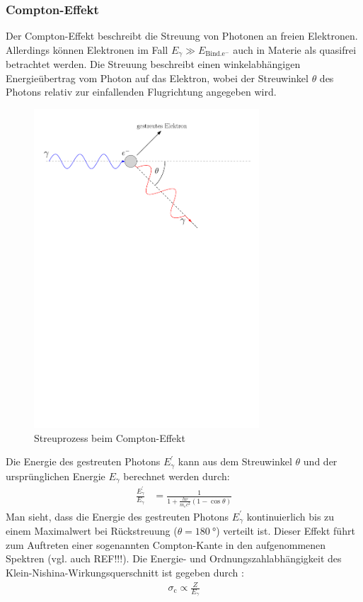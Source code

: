 \documentclass[11pt, a4paper]{article}
\numberwithin{equation}{section}
\begin{document}
\subsubsection{Compton-Effekt}
Der Compton-Effekt beschreibt die Streuung von Photonen an freien Elektronen.
Allerdings können Elektronen im Fall $E_\gamma \gg E_\mathrm{Bind. e^{-}}$ auch in Materie als quasifrei betrachtet werden.
Die Streuung beschreibt einen winkelabhängigen Energieübertrag vom Photon auf das Elektron, wobei der Streuwinkel $\theta$ des Photons relativ zur einfallenden Flugrichtung angegeben wird.
\begin{figure}
	\centering
	\includegraphics[width=0.75\textwidth]{./figures/compton.pdf}
	\caption{Streuprozess beim Compton-Effekt}
	\label{fig:comptoneffekt}
\end{figure}
Die Energie des gestreuten Photons $E_\gamma^\prime$ kann aus dem Streuwinkel $\theta$ und der ursprünglichen Energie $E_\gamma$ berechnet werden durch:
\begin{align}
	\frac{E_\gamma^\prime}{E_\gamma} &= \frac{1}{1 + \frac{h \nu}{m_\mathrm{e} c^2} (1-\cos\theta)}
\end{align}
Man sieht, dass die Energie des gestreuten Photons $E_\gamma^\prime$ kontinuierlich bis zu einem Maximalwert bei Rückstreuung ($\theta = \SI{180}{\degree}$) verteilt ist.
Dieser Effekt führt zum Auftreten einer sogenannten Compton-Kante in den aufgenommenen Spektren (vgl. auch REF!!!).
Die Energie- und Ordnungszahlabhängigkeit des Klein-Nishina-Wirkungsquerschnitt ist gegeben durch \cite{wermes}:
\begin{align}
	\sigma_\mathrm{c} \propto \frac{Z}{E_\gamma}
\end{align}
\end{document}
